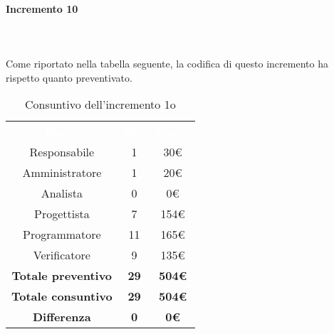 \paragraph*{Incremento 10} \mbox{} \\ \mbox{} \\
Come riportato nella tabella seguente, la codifica di questo incremento ha rispetto quanto preventivato.
\begin{table}[H]
\centering\renewcommand{\arraystretch}{1.5}
\caption{Consuntivo dell'incremento 1o}
\vspace{0.2cm}
\begin{tabular}{ c c c }
\rowcolor{redafk}
\textcolor{white}{\textbf{Ruolo}} & \textcolor{white}{\textbf{Ore}} &
\textcolor{white}{\textbf{Costo}}  \\
Responsabile 	& 1 & 30€ \\
Amministratore 	& 1 & 20€ \\
Analista 		& 0 & 0€ \\
Progettista		& 7 & 154€ \\
Programmatore	& 11 & 165€\\
Verificatore 	& 9 &  135€\\
\textbf{Totale preventivo} & \textbf{29} & \textbf{504€}  \\
\textbf{Totale consuntivo} & \textbf{29} & \textbf{504€}  \\
\rowcolor{lastrowcolor}
\textbf{Differenza} & \textbf{0} & \textbf{0€} \\
\end{tabular}
\end{table}

